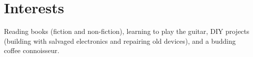 \section{Interests}
\noindent
Reading books (fiction and non-fiction), learning to play the guitar, DIY projects (building with salvaged electronics and repairing old devices), and a budding coffee connoisseur.

